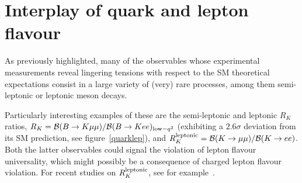 \section{Interplay of quark and lepton flavour}
\label{sec:lepfla}

As previously highlighted, many of the observables whose experimental
measurements reveal lingering tensions with respect to the SM
theoretical expectations consist in a large variety of 
(very) rare processes, among them semi-leptonic
or leptonic meson decays.

Particularly interesting examples of
these are the semi-leptonic and leptonic $R_K$ ratios, 
$R_K = {\cal B}(B\rightarrow K\mu\mu)/{\cal B}(B\rightarrow Kee)_{{\rm low}-q^2}$ (exhibiting a 
$2.6\sigma$ deviation from its SM prediction, see figure~\ref{quarklep}), and 
$R_K^{\rm leptonic} = {\cal B}(K\rightarrow \mu\mu)/{\cal B}(K\rightarrow ee)$.
Both the latter observables could signal the violation of lepton flavour
universality, which might possibly be a consequence of charged lepton
flavour violation. For recent studies on $R_K^{\rm leptonic}$, see for
  example~\cite{Fonseca:2012kr,Abada:2012mc,Abada:2013aba}.   
 
